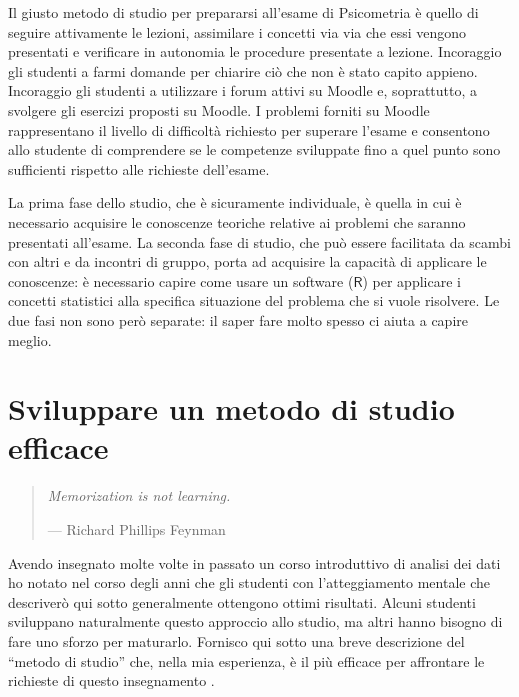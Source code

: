 \documentclass[
  10pt,
  italian,
  a4paper,
  extrafontsizes,onecolumn,openright
  ]{memoir}
\theoremstyle{definition}
\theoremstyle{definition}
\theoremstyle{definition}
\theoremstyle{definition}
\theoremstyle{remark}
\begin{document}
Il giusto metodo di studio per prepararsi all'esame di Psicometria è quello di seguire attivamente le lezioni, assimilare i concetti via via che essi vengono presentati e verificare in autonomia le procedure presentate a lezione. Incoraggio gli studenti a farmi domande per chiarire ciò che non è stato capito appieno. Incoraggio gli studenti a utilizzare i forum attivi su Moodle e, soprattutto, a svolgere gli esercizi proposti su Moodle. I problemi forniti su Moodle rappresentano il livello di difficoltà richiesto per superare l'esame e consentono allo studente di comprendere se le competenze sviluppate fino a quel punto sono sufficienti rispetto alle richieste dell'esame.

La prima fase dello studio, che è sicuramente individuale, è quella in cui è necessario acquisire le conoscenze teoriche relative ai problemi che saranno presentati all'esame. La seconda fase di studio, che può essere facilitata da scambi con altri e da incontri di gruppo, porta ad acquisire la capacità di applicare le conoscenze: è necessario capire come usare un software (\(\textsf{R}\)) per applicare i concetti statistici alla specifica situazione del problema che si vuole risolvere. Le due fasi non sono però separate: il saper fare molto spesso ci aiuta a capire meglio.

\hypertarget{sviluppare-un-metodo-di-studio-efficace}{%
\section*{Sviluppare un metodo di studio efficace}\label{sviluppare-un-metodo-di-studio-efficace}}

\begin{quote}
\emph{Memorization is not learning.}

\hfill --- Richard Phillips Feynman
\end{quote}

Avendo insegnato molte volte in passato un corso introduttivo di analisi dei dati ho notato nel corso degli anni che gli studenti con l'atteggiamento mentale che descriverò qui sotto generalmente ottengono ottimi risultati. Alcuni studenti sviluppano naturalmente questo approccio allo studio, ma altri hanno bisogno di fare uno sforzo per maturarlo. Fornisco qui sotto una breve descrizione del ``metodo di studio'' che, nella mia esperienza, è il più efficace per affrontare le richieste di questo insegnamento \autocite{burger20125}.
\end{document}
